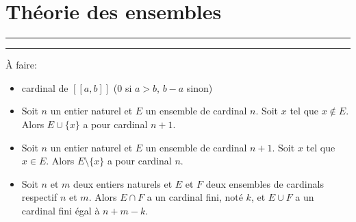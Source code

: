 \section{Théorie des ensembles}















\bigskip

\hrule
\hrule

\medskip

\noindent À faire:
\begin{itemize}
    \item cardinal de $[\![a,b]\!]$ ($0$ si $a > b$, $b-a$ sinon)
    \item Soit $n$ un entier naturel et $E$ un ensemble de cardinal $n$. Soit $x$ tel que $x \notin E$. Alors $E \cup \lbrace x \rbrace$ a pour cardinal $n+1$.
    \item Soit $n$ un entier naturel et $E$ un ensemble de cardinal $n+1$. Soit $x$ tel que $x \in E$. Alors $E \setminus \lbrace x \rbrace$ a pour cardinal $n$.
    \item Soit $n$ et $m$ deux entiers naturels et $E$ et $F$ deux ensembles de cardinals respectif $n$ et $m$. Alors $E \cap F$ a un cardinal fini, noté $k$, et $E \cup F$ a un cardinal fini égal à $n+m-k$.
\end{itemize}
